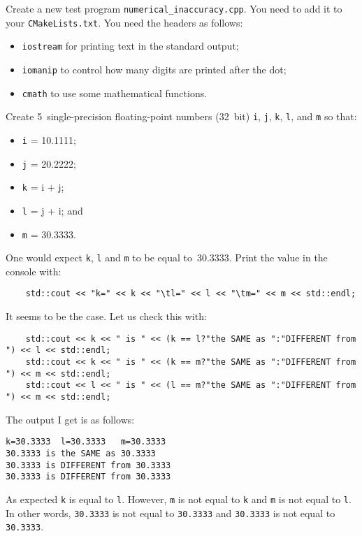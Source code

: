 \documentclass[english,a4paper,12pt,oneside]{article}
\begin{document}
Create a new test program \verb+numerical_inaccuracy.cpp+. 
You need to add it to your \verb+CMakeLists.txt+. 
You need the headers as follows:
\begin{itemize}
\item \verb+iostream+ for printing text in the standard output;
\item \verb+iomanip+ to control how many digits are printed after the dot;
\item \verb+cmath+ to use some mathematical functions.
\end{itemize}
Create 5~single-precision floating-point numbers (32~bit) \verb+i+, \verb+j+, \verb+k+, \verb+l+, and \verb+m+ so that:
\begin{itemize}
	\item \verb+i+ = 10.1111;
	\item \verb+j+ = 20.2222;
	\item \verb+k+ = i + j;
	\item \verb+l+ = j + i; and
	\item \verb+m+ = 30.3333.
\end{itemize}
One would expect \verb+k+, \verb+l+ and \verb+m+ to be equal to~30.3333. 
Print the value in the console with:
\begin{lstlisting}
    std::cout << "k=" << k << "\tl=" << l << "\tm=" << m << std::endl;
\end{lstlisting}
It seems to be the case. 
Let us check this with:
\begin{lstlisting}
    std::cout << k << " is " << (k == l?"the SAME as ":"DIFFERENT from ") << l << std::endl;
    std::cout << k << " is " << (k == m?"the SAME as ":"DIFFERENT from ") << m << std::endl;
    std::cout << l << " is " << (l == m?"the SAME as ":"DIFFERENT from ") << m << std::endl;
\end{lstlisting}

The output I get is as follows:
\begin{verbatim}
k=30.3333  l=30.3333   m=30.3333
30.3333 is the SAME as 30.3333
30.3333 is DIFFERENT from 30.3333
30.3333 is DIFFERENT from 30.3333
\end{verbatim}

As expected \verb+k+ is equal to \verb+l+. 
However, \verb+m+ is not equal to \verb+k+ and \verb+m+ is not equal to \verb+l+. 
In other words, \verb+30.3333+ is not equal to \verb+30.3333+ and \verb+30.3333+ is not equal to \verb+30.3333+. 
\end{document}
